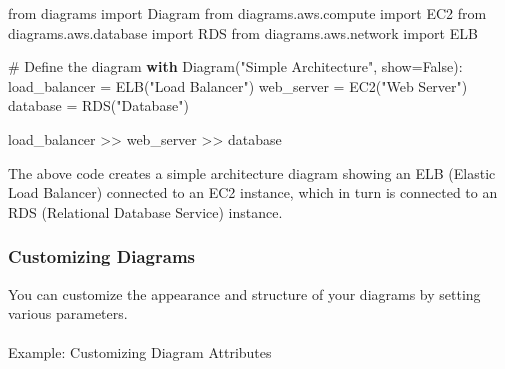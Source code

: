 \documentclass[
  letterpaper,
  DIV=11,
  numbers=noendperiod]{scrreprt}
\makeatletter
\let\oldparagraph\paragraph
\renewcommand{\paragraph}{
    \@ifstar
      \xxxParagraphStar
      \xxxParagraphNoStar
  }
\newcommand{\xxxParagraphStar}[1]{\oldparagraph*{#1}\mbox{}}
\newcommand{\xxxParagraphNoStar}[1]{\oldparagraph{#1}\mbox{}}
\newenvironment{Shaded}{\begin{snugshade}}{\end{snugshade}}
\newcommand{\CommentTok}[1]{\textcolor[rgb]{0.37,0.37,0.37}{#1}}
\newcommand{\ControlFlowTok}[1]{\textcolor[rgb]{0.00,0.23,0.31}{\textbf{#1}}}
\newcommand{\ImportTok}[1]{\textcolor[rgb]{0.00,0.46,0.62}{#1}}
\newcommand{\NormalTok}[1]{\textcolor[rgb]{0.00,0.23,0.31}{#1}}
\newcommand{\OperatorTok}[1]{\textcolor[rgb]{0.37,0.37,0.37}{#1}}
\newcommand{\StringTok}[1]{\textcolor[rgb]{0.13,0.47,0.30}{#1}}
\newcommand{\VariableTok}[1]{\textcolor[rgb]{0.07,0.07,0.07}{#1}}
\makeatother
\begin{document}
\begin{Shaded}
\begin{Highlighting}[]
\ImportTok{from}\NormalTok{ diagrams }\ImportTok{import}\NormalTok{ Diagram}
\ImportTok{from}\NormalTok{ diagrams.aws.compute }\ImportTok{import}\NormalTok{ EC2}
\ImportTok{from}\NormalTok{ diagrams.aws.database }\ImportTok{import}\NormalTok{ RDS}
\ImportTok{from}\NormalTok{ diagrams.aws.network }\ImportTok{import}\NormalTok{ ELB}

\CommentTok{\# Define the diagram}
\ControlFlowTok{with}\NormalTok{ Diagram(}\StringTok{"Simple Architecture"}\NormalTok{, show}\OperatorTok{=}\VariableTok{False}\NormalTok{):}
\NormalTok{    load\_balancer }\OperatorTok{=}\NormalTok{ ELB(}\StringTok{"Load Balancer"}\NormalTok{)}
\NormalTok{    web\_server }\OperatorTok{=}\NormalTok{ EC2(}\StringTok{"Web Server"}\NormalTok{)}
\NormalTok{    database }\OperatorTok{=}\NormalTok{ RDS(}\StringTok{"Database"}\NormalTok{)}

\NormalTok{    load\_balancer }\OperatorTok{\textgreater{}\textgreater{}}\NormalTok{ web\_server }\OperatorTok{\textgreater{}\textgreater{}}\NormalTok{ database}
\end{Highlighting}
\end{Shaded}

The above code creates a simple architecture diagram showing an ELB
(Elastic Load Balancer) connected to an EC2 instance, which in turn is
connected to an RDS (Relational Database Service) instance.

\subsubsection{Customizing Diagrams}\label{customizing-diagrams}

You can customize the appearance and structure of your diagrams by
setting various parameters.

\paragraph{Example: Customizing Diagram
Attributes}\label{example-customizing-diagram-attributes}
\end{document}
